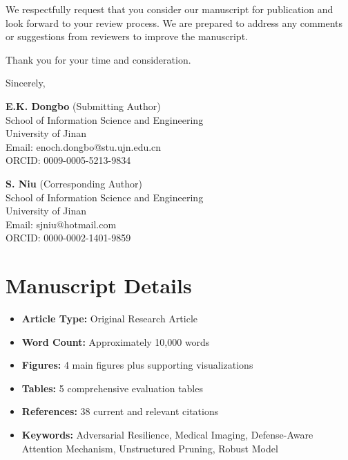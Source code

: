 \documentclass[12pt]{article}
\begin{document}
We respectfully request that you consider our manuscript for publication and look forward to your review process. We are prepared to address any comments or suggestions from reviewers to improve the manuscript.

Thank you for your time and consideration.

\vspace{1cm}

\noindent
Sincerely,

\vspace{1cm}

\noindent
\textbf{E.K. Dongbo} (Submitting Author) \\
School of Information Science and Engineering \\
University of Jinan \\
Email: enoch.dongbo@stu.ujn.edu.cn \\
ORCID: 0009-0005-5213-9834

\vspace{0.5cm}

\noindent
\textbf{S. Niu} (Corresponding Author) \\
School of Information Science and Engineering \\
University of Jinan \\
Email: sjniu@hotmail.com \\
ORCID: 0000-0002-1401-9859

\section*{Manuscript Details}
\begin{itemize}
    \item \textbf{Article Type:} Original Research Article
    \item \textbf{Word Count:} Approximately 10,000 words
    \item \textbf{Figures:} 4 main figures plus supporting visualizations
    \item \textbf{Tables:} 5 comprehensive evaluation tables
    \item \textbf{References:} 38 current and relevant citations
    \item \textbf{Keywords:} Adversarial Resilience, Medical Imaging, Defense-Aware Attention Mechanism, Unstructured Pruning, Robust Model
\end{itemize}
\end{document}
